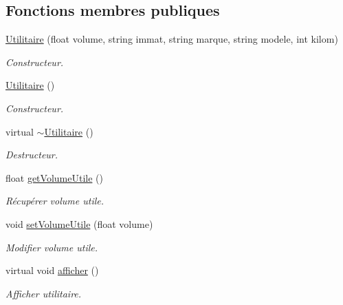 \subsection*{Fonctions membres publiques}
\begin{DoxyCompactItemize}
\item 
\hyperlink{class_utilitaire_a8ccd7739f6755868098c7ba8c48ed3ef}{Utilitaire} (float volume, string immat, string marque, string modele, int kilom)
\begin{DoxyCompactList}\small\item\em Constructeur. \item\end{DoxyCompactList}\item 
\hyperlink{class_utilitaire_a8a4af48b60aaeefe9b6399ed94495662}{Utilitaire} ()
\begin{DoxyCompactList}\small\item\em Constructeur. \item\end{DoxyCompactList}\item 
virtual \hyperlink{class_utilitaire_af6e70ea8eb994ab8744429b37d5a9934}{$\sim$Utilitaire} ()
\begin{DoxyCompactList}\small\item\em Destructeur. \item\end{DoxyCompactList}\item 
float \hyperlink{class_utilitaire_acde47d7bc100eb5fdf2195bb8307d36a}{getVolumeUtile} ()
\begin{DoxyCompactList}\small\item\em Récupérer volume utile. \item\end{DoxyCompactList}\item 
void \hyperlink{class_utilitaire_a085a6c510c036cbb88d91682751f3588}{setVolumeUtile} (float volume)
\begin{DoxyCompactList}\small\item\em Modifier volume utile. \item\end{DoxyCompactList}\item 
virtual void \hyperlink{class_utilitaire_a1092986e687a5a907bc86d252a8416c9}{afficher} ()
\begin{DoxyCompactList}\small\item\em Afficher utilitaire. \item\end{DoxyCompactList}\end{DoxyCompactItemize}


